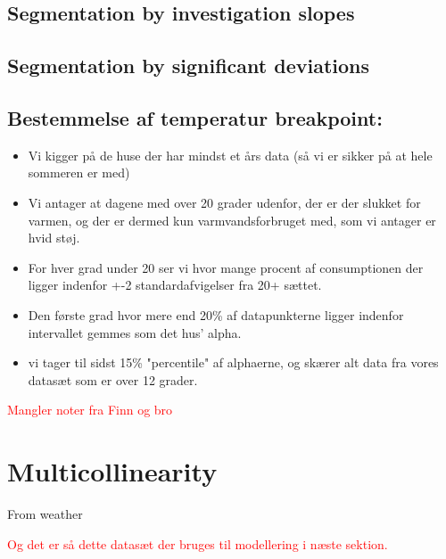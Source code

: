 \subsection*{Segmentation by investigation slopes}

\subsection*{Segmentation by significant deviations}

\subsection*{Bestemmelse af temperatur breakpoint:}
\begin{itemize}
    \item Vi kigger på de huse der har mindst et års data (så vi er sikker på at hele sommeren er med)
    \item Vi antager at dagene med over 20 grader udenfor, der er der slukket for varmen, og der er dermed kun varmvandsforbruget med, som vi antager er hvid støj.
    \item For hver grad under 20 ser vi hvor mange procent af consumptionen der ligger indenfor +-2 standardafvigelser fra 20+ sættet.
    \item Den første grad hvor mere end 20\% af datapunkterne ligger indenfor intervallet gemmes som det hus' alpha.
    \item vi tager til sidst 15\% "percentile" af alphaerne, og skærer alt data fra vores datasæt som er over 12 grader.
\end{itemize}

\textcolor{red}{Mangler noter fra Finn og bro}


\section{Multicollinearity}
From weather



\textcolor{red}{Og det er så dette datasæt der bruges til modellering i næste sektion.}